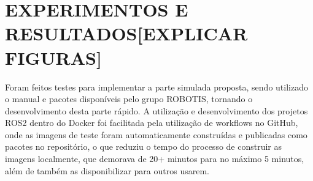 \chapter{EXPERIMENTOS E RESULTADOS[EXPLICAR FIGURAS]}
\label{experimentos}

Foram feitos testes para implementar a parte simulada proposta, sendo utilizado o manual \cite{turtlebot3_manual} e pacotes \cite{turtlebot3_github} disponíveis pelo grupo ROBOTIS, tornando o desenvolvimento desta parte rápido. A utilização e desenvolvimento dos projetos ROS2 dentro do Docker foi facilitada pela utilização de workflows no GitHub, onde as imagens de teste foram automaticamente construídas e publicadas como pacotes no repositório, o que reduziu o tempo do processo de construir as imagens localmente, que demorava de 20+ minutos para no máximo 5 minutos, além de também as disponibilizar para outros usarem.


